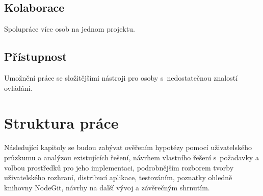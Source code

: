 \subsection{Kolaborace}

Spolupráce více osob na jednom projektu.

\subsection{Přístupnost}

Umožnění práce se složitějšími nástroji pro osoby s~nedostatečnou znalostí ovládání.

\section{Struktura práce}

Následující kapitoly se budou zabývat ověřením hypotézy pomocí uživatelského průzkumu a analýzou existujících řešení, návrhem vlastního řešení s~požadavky a volbou prostředků pro jeho implementaci, podrobnějším rozborem tvorby uživatelského rozhraní, distribucí aplikace, testováním, poznatky ohledně knihovny NodeGit, návrhy na další vývoj a závěrečným shrnutím.
